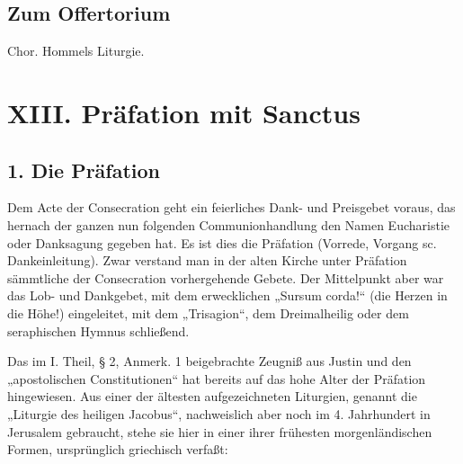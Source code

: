 \section{Zum Offertorium}

Chor. Hommels Liturgie.





\chapter{XIII. Präfation mit Sanctus}


\section{1. Die Präfation}

Dem Acte der Consecration geht ein feierliches Dank- und Preisgebet voraus, das hernach der ganzen nun folgenden Communionhandlung den Namen Eucharistie oder Danksagung gegeben hat. Es ist dies die Präfation (Vorrede, Vorgang sc. Dankeinleitung). Zwar verstand man in der alten Kirche unter Präfation sämmtliche der Consecration vorhergehende Gebete. Der Mittelpunkt aber war das Lob- und Dankgebet, mit dem erwecklichen „Sursum corda!“ (die Herzen in die Höhe!) eingeleitet, mit dem „Trisagion“, dem Dreimalheilig oder dem seraphischen Hymnus schließend.

Das im I. Theil, § 2, Anmerk. 1 beigebrachte Zeugniß aus Justin und den „apostolischen Constitutionen“ hat bereits auf das hohe Alter der Präfation hingewiesen. Aus einer der ältesten aufgezeichneten Liturgien, genannt die „Liturgie des heiligen Jacobus“, nachweislich aber noch im 4. Jahrhundert in Jerusalem gebraucht, stehe sie hier in einer ihrer frühesten morgenländischen Formen, ursprünglich griechisch verfaßt:

